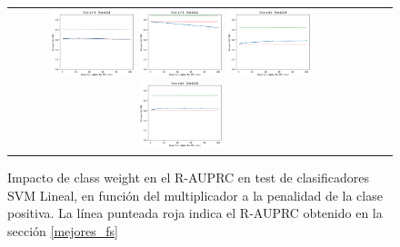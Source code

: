 \begin{figure}[h!]
\begin{tabular}{cccc}
\includegraphics[width=0.25\textwidth]{Kap7/cw/train=b278_test=b234_linear_individual_curves.png}  \includegraphics[width=0.25\textwidth]{Kap7/cw/train=b278_test=b261_linear_individual_curves.png} 
 \includegraphics[width=0.25\textwidth]{Kap7/cw/train=b360_test=b234_linear_individual_curves.png}  \includegraphics[width=0.25\textwidth]{Kap7/cw/train=b360_test=b278_linear_individual_curves.png} 
\end{tabular}
\caption{Impacto de class weight en el R-AUPRC en test de clasificadores SVM Lineal, en función del multiplicador a la penalidad de la clase positiva. La línea punteada roja indica el R-AUPRC obtenido en la sección \protect\ref{mejores_fs}}
\label{fig:cw_l}
\end{figure}

